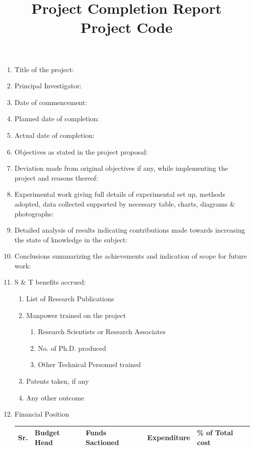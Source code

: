 \documentclass{article}
\title{ Project Completion Report \\
Project Code}
\date{}
\begin{document}
\maketitle
\begin{enumerate}
    \item Title of the project: 
    \item Principal Investigator: 
    \item Date of commencement:
    \item Planned date of completion:
    \item Actual date of completion:
    \item Objectives as stated in the project proposal: 
    \item Deviation made from original objectives if any, while implementing the project and reasons thereof: 
    \item Experimental work giving full details of experimental set up, methods adopted, data collected supported by necessary table, charts, diagrams \& photographs:
    \item Detailed analysis of results indicating contributions made towards increasing the state of knowledge in the subject:
    \item Conclusions summarizing the achievements and indication of scope for future work:
    \item S \& T benefits accrued:
    \begin{enumerate}
        \item List of Research Publications
        \item Manpower trained on the project
        \begin{enumerate}
            \item Research Scientists or Research Associates
            \item No. of Ph.D. produced
            \item Other Technical Personnel trained
        \end{enumerate}
        \item Patents taken, if any
        \item Any other outcome
    \end{enumerate}
    \item Financial Position
    \begin{table}[]
        \centering
        \begin{tabular}{|l|l|l|l|l|}
        \hline
        \textbf{Sr.} & \textbf{Budget Head} & \textbf{Funds Sactioned} & \textbf{Expenditure} & \textbf{\% of Total cost} \\ \hline

\end{tabular}
\end{table}
\end{enumerate}
\end{document}
